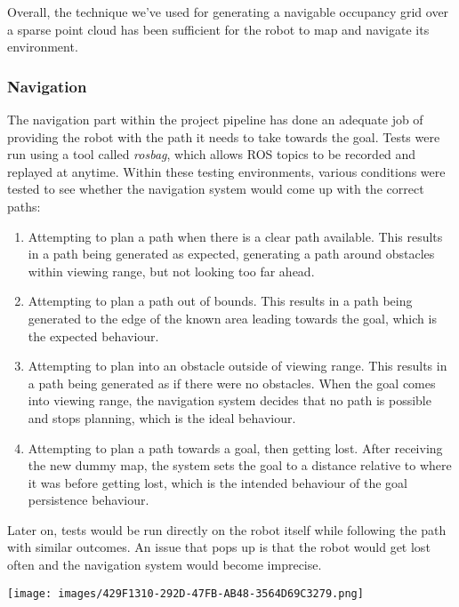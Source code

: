 \documentclass[10pt,english]{article}
\begin{document}
Overall, the technique we've used for generating a navigable occupancy grid over a sparse point cloud has been sufficient for the robot to map and navigate its environment.

\subsubsection*{Navigation}

The navigation part within the project pipeline has done an adequate job of providing the robot with the path it needs to take towards the goal. Tests were run using a tool called \textit{rosbag}, which allows ROS topics to be recorded and replayed at anytime. Within these testing environments, various conditions were tested to see whether the navigation system would come up with the correct paths:

\begin{enumerate}[noitemsep]
    \item Attempting to plan a path when there is a clear path available. This results in a path being generated as expected, generating a path around obstacles within viewing range, but not looking too far ahead. %
    \item Attempting to plan a path out of bounds. This results in a path being generated to the edge of the known area leading towards the goal, which is the expected behaviour.
    \item Attempting to plan into an obstacle outside of viewing range. This results in a path being generated as if there were no obstacles. When the goal comes into viewing range, the navigation system decides that no path is possible and stops planning, which is the ideal behaviour.
    \item Attempting to plan a path towards a goal, then getting lost. After receiving the new dummy map, the system sets the goal to a distance relative to where it was before getting lost, which is the intended behaviour of the goal persistence behaviour.
\end{enumerate}

Later on, tests would be run directly on the robot itself while following the path with similar outcomes. An issue that pops up is that the robot would get lost often and the navigation system would become imprecise. %

\clearpage

\vspace*{\fill}
\begin{center}
\texttt{[image: images/429F1310-292D-47FB-AB48-3564D69C3279.png]}
\end{center}
\vfill
\thispagestyle{empty}
\clearpage
\end{document}
